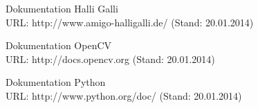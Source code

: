 \begin{thebibliography}{sotief}

Dokumentation Halli Galli
\newblock \\URL: http://www.amigo-halligalli.de/ (Stand: 20.01.2014)

Dokumentation OpenCV
\newblock \\URL: http://docs.opencv.org (Stand: 20.01.2014)

Dokumentation Python
\newblock \\URL: http://www.python.org/doc/ (Stand: 20.01.2014)



\end{thebibliography}
